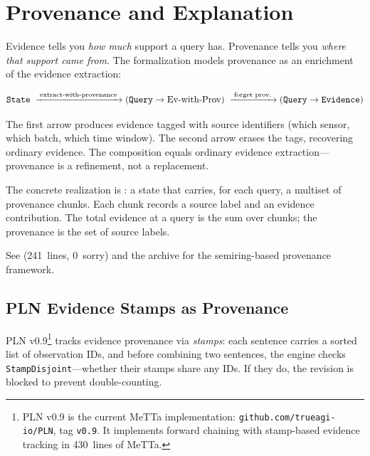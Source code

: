 \documentclass[11pt,openany]{report}
\begin{document}
\section{Provenance and Explanation}
\label{sec:provenance}

Evidence tells you \emph{how much} support a query has.  Provenance
tells you \emph{where that support came from}.  The formalization
models provenance as an enrichment of the evidence extraction:

\[
  \texttt{State}
  \;\xrightarrow{\;\text{extract-with-provenance}\;}
  (\texttt{Query} \to \text{Ev-with-Prov})
  \;\xrightarrow{\;\text{forget prov.}\;}
  (\texttt{Query} \to \mathtt{Evidence})
\]

\noindent
The first arrow produces evidence tagged with source identifiers
(which sensor, which batch, which time window).  The second arrow
erases the tags, recovering ordinary evidence.  The composition
equals ordinary evidence extraction---provenance is a refinement,
not a replacement.

The concrete realization is : a state that
carries, for each query, a multiset of provenance chunks.  Each chunk
records a source label and an evidence contribution.  The total
evidence at a query is the sum over chunks; the provenance is the
set of source labels.


\noindent
See 
(241~lines, 0~sorry) and the 
archive for the semiring-based provenance framework.

\subsection{PLN Evidence Stamps as Provenance}
\label{sec:pln-stamps}

PLN v0.9\footnote{PLN v0.9 is the current MeTTa implementation:
\texttt{github.com/trueagi-io/PLN}, tag \texttt{v0.9}.  It implements
forward chaining with stamp-based evidence tracking in 430~lines of
MeTTa.} tracks evidence provenance via \emph{stamps}: each sentence
carries a sorted list of observation IDs, and before combining two
sentences, the engine checks \texttt{StampDisjoint}---whether their
stamps share any IDs.  If they do, the revision is blocked to prevent
double-counting.
\end{document}
